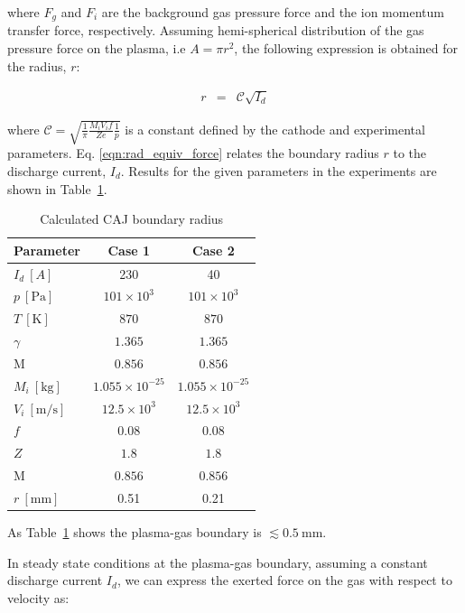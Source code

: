 \documentclass[a4paper]{iacas}%
\begin{document}
\noindent where $F_g$ and $F_i$ are the background gas pressure force and the ion momentum transfer force, respectively. Assuming hemi-spherical distribution of the gas pressure force on the plasma, i.e $A = \pi r^2$, the following expression is obtained for the radius, $r$:

\begin{eqnarray}
\label{eqn:rad_equiv_force}
	r & = & \mathcal{C}\sqrt{I_d}
\end{eqnarray}


\noindent where $\mathcal{C} = \sqrt{\frac{1}{\pi}\frac{M_i V_i f}{Z e}\frac{1}{p}}$ is a constant defined by the cathode and experimental parameters. Eq. \eqref{eqn:rad_equiv_force} relates the boundary radius $r$ to the discharge current, $I_d$. Results for the given parameters in the experiments \cite{KR,KRClose} are shown in Table~\ref{t:radii}.
\begin{table}[h]
	\begin{center}
		\begin{threeparttable}
			\caption{Calculated CAJ boundary radius}
			\label{t:radii}
			\begin{tabular}{l|c|c}
				Parameter & Case 1 & Case 2\\ \hline
				$I_d~[A]$& 230 & 40\\
				$p~\mathrm{[Pa]}$ & $101 \times 10^3 $ & $101 \times 10^3 $ \\
				$T~\mathrm{[K]}$	& $870$ & $870$ \\
				$\gamma$ & $1.365$ & $1.365$ \\ 
				$\mathrm{M}$	& $0.856$ & $0.856$ \\
				$M_i~\mathrm{[kg]}$ & $1.055 \times 10^{-25} $ & $1.055 \times 10^{-25} $  \\
				$V_i~\mathrm{[m/s]}$ 	& $12.5 \times 10^3 $ & $12.5 \times 10^3 $  \\
				$f$ 	& $0.08 $ & $0.08 $ \\
				$Z$	& $1.8 $ & $1.8 $ \\
				$\mathrm{M}$	& $0.856$ & $0.856$ \\
				$r~\mathrm{[mm]}$ 	& 0.51& 0.21
			\end{tabular}
		\end{threeparttable}
	\end{center}
\end{table}
As Table~\ref{t:radii} shows the plasma-gas boundary is $\lesssim 0.5~\mathrm{mm}$.

In steady state conditions at the plasma-gas boundary, assuming a constant discharge current $I_d$, we can express the exerted force on the gas with respect to velocity as:
\end{document}
